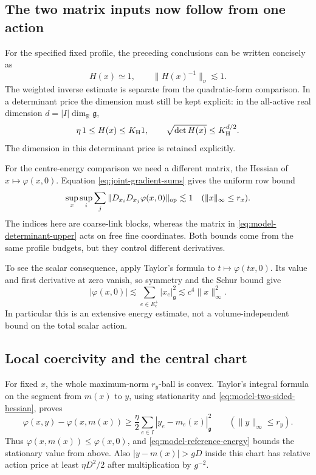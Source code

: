 \documentclass[11pt,reqno]{amsart}
\numberwithin{equation}{section}
\theoremstyle{definition}
\theoremstyle{remark}
\newcommand{\R}{\mathbb R}
\newcommand{\g}{\mathfrak g}
\begin{document}
\subsection{The two matrix inputs now follow from one action}

For the specified fixed profile, the preceding conclusions
can be written concisely as
\[
       H(x)\simeq1,\qquad
                   \|H(x)^{-1}\|_\nu\lesssim1.
\]
The weighted inverse estimate is separate from the
quadratic-form comparison. In a determinant price the
dimension must still be kept explicit: in the all-active
real dimension \(d=|I|\dim_{\R}\g\),
\begin{equation}
       \eta\,1\le H(x)\le K_{\rm H}1,
       \qquad \sqrt{\det H(x)}\le K_{\rm H}^{d/2}.
 \label{eq:model-determinant-upper}
\end{equation}
The dimension in this determinant price is retained explicitly.

For the centre-energy comparison we need a different matrix,
the Hessian of \(x\mapsto\varphi(x,0)\). Equation
\eqref{eq:joint-gradient-sums} gives the uniform row bound
\begin{equation}
       \sup_x\sup_i\sum_j
            \|D_{x_i}D_{x_j}\varphi(x,0)\|_{\rm op}\lesssim1
               \quad(\|x\|_\infty\le r_x).
 \label{eq:model-coarse-row-bound}
\end{equation}
The indices here are coarse-link blocks, whereas the matrix in
\eqref{eq:model-determinant-upper} acts on free fine coordinates.
Both bounds come from the same profile budgets, but they
control different derivatives.

To see the scalar consequence, apply Taylor's formula to
\(t\mapsto\varphi(tx,0)\). Its value and first derivative at
zero vanish, so symmetry and the Schur bound give
\begin{equation}
       |\varphi(x,0)|
            \lesssim\sum_{e\in E_c^+}|x_e|_{\g}^2
            \lesssim c^4\|x\|_\infty^2.
 \label{eq:model-reference-energy}
\end{equation}
In particular this is an extensive energy estimate, not a
volume-independent bound on the total scalar action.

\subsection{Local coercivity and the central chart}

For fixed \(x\), the whole maximum-norm \(r_y\)-ball is
convex. Taylor's integral formula on the segment from \(m(x)\)
to \(y\), using stationarity and
\eqref{eq:model-two-sided-hessian}, proves
\begin{equation}
       \varphi(x,y)-\varphi(x,m(x))
              \ge\frac\eta2\sum_{e\in I}|y_e-m_e(x)|_{\g}^2
              \qquad(\|y\|_\infty\le r_y).
 \label{eq:model-local-coercivity}
\end{equation}
Thus \(\varphi(x,m(x))\le\varphi(x,0)\), and
\eqref{eq:model-reference-energy} bounds the stationary value
from above. Also \(|y-m(x)|>gD\) inside this chart has
relative action price at least \(\eta D^2/2\) after multiplication
by \(g^{-2}\).
\end{document}
